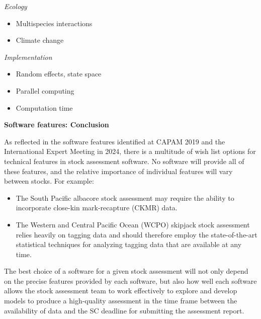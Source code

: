 \documentclass{SCreport}
\begin{document}
\vspace{1ex}

\textit{Ecology}

\begin{itemize}
  \item Multispecies interactions\\[-4.5ex]
  \item Climate change
\end{itemize}

\vspace{1ex}

\textit{Implementation}

\begin{itemize}
  \item Random effects, state space\\[-4.5ex]
  \item Parallel computing\\[-4.5ex]
  \item Computation time
\end{itemize}

\newpage

\textbf{Software features: Conclusion}

As reflected in the software features identified at CAPAM 2019 and the
International Expert Meeting in 2024, there is a multitude of wish list options
for technical features in stock assessment software. No software will provide
all of these features, and the relative importance of individual features will
vary between stocks. For example:

\begin{itemize}
  \item The South Pacific albacore stock assessment may require the ability to
  incorporate close-kin mark-recapture (CKMR) data.
  \item The Western and Central Pacific Ocean (WCPO) skipjack stock assessment
  relies heavily on tagging data and should therefore employ the
  state-of-the-art statistical techniques for analyzing tagging data that are
  available at any time.
\end{itemize}

The best choice of a software for a given stock assessment will not only depend
on the precise features provided by each software, but also how well each
software allows the stock assessment team to work effectively to explore and
develop models to produce a high-quality assessment in the time frame between
the availability of data and the SC deadline for submitting the assessment
report.
\end{document}
